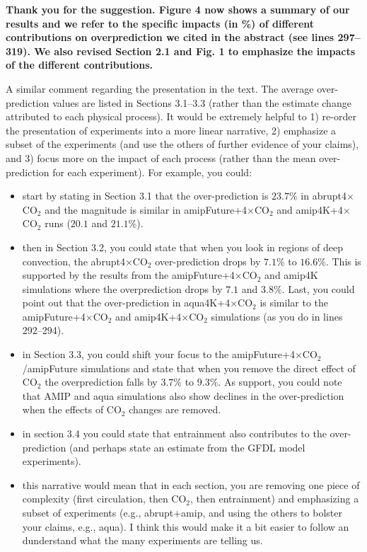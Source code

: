 \documentclass[11pt]{article}
\begin{document}
\textbf{Thank you for the suggestion. Figure 4 now shows a summary of our results and we refer to the specific impacts (in \%) of different contributions on overprediction we cited in the abstract (see lines 297--319). We also revised Section 2.1 and Fig. 1 to emphasize the impacts of the different contributions.}

A similar comment regarding the presentation in the text. The average over-prediction values are listed in Sections 3.1--3.3 (rather than the estimate change attributed to each physical process). It would be extremely helpful to 1) re-order the presentation of experiments into a more linear narrative, 2) emphasize a subset of the experiments (and use the others of further evidence of your claims), and 3) focus more on the impact of each process (rather than the mean over-prediction for each experiment). For example, you could:
\begin{itemize}
\item start by stating in Section 3.1 that the over-prediction is \(23.7\%\) in abrupt4\(\times\)CO\(_2\) and the magnitude is similar in amipFuture+4\(\times\)CO\(_2\) and amip4K+4\(\times\)CO\(_2\) runs (\(20.1\) and \(21.1\%\)).
\item then in Section 3.2, you could state that when you look in regions of deep convection, the abrupt4\(\times\)CO\(_2\) over-prediction drops by \(7.1\%\) to \(16.6\%\). This is supported by the results from the amipFuture+4\(\times\)CO\(_2\) and amip4K simulations where the overprediction drops by \(7.1\) and \(3.8\%\). Last, you could point out that the over-prediction in aqua4K+4\(\times\)CO\(_2\) is similar to the amipFuture+4\(\times\)CO\(_2\) and amip4K+4\(\times\)CO\(_2\) simulations (as you do in lines 292--294).
\item in Section 3.3, you could shift your focus to the amipFuture+4\(\times\)CO\(_2\)/amipFuture simulations and state that when you remove the direct effect of CO\(_2\) the overprediction falls by \(3.7\%\) to \(9.3\%\). As support, you could note that AMIP and aqua simulations also show declines in the over-prediction when the effects of CO\(_2\) changes are removed.
\item in section 3.4 you could state that entrainment also contributes to the over-prediction (and perhaps state an estimate from the GFDL model experiments).
\item this narrative would mean that in each section, you are removing one piece of complexity (first circulation, then CO\(_2\), then entrainment) and emphasizing a subset of experiments (e.g., abrupt+amip, and using the others to bolster your claims, e.g., aqua). I think this would make it a bit easier to follow an dunderstand what the many experiments are telling us.
\end{itemize}
\end{document}
